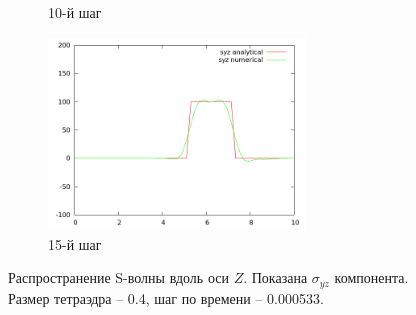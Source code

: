 \begin{figure}[H]
\begin{subfigure}[b]{0.5\textwidth}
\caption{10-й шаг}
\end{subfigure}
\begin{subfigure}[b]{0.5\textwidth}
\centering
\includegraphics[width=0.75\textwidth]{png/veryfication/0.4/s-wave-along-z15.png}
\caption{15-й шаг}
\end{subfigure}
\caption{Распространение S-волны вдоль оси $Z$. Показана $\sigma_{yz}$ компонента. Размер тетраэдра -- 0.4, шаг по времени -- 0.000533. }
\label{pic:s_wave_along_z4}
\end{figure}

